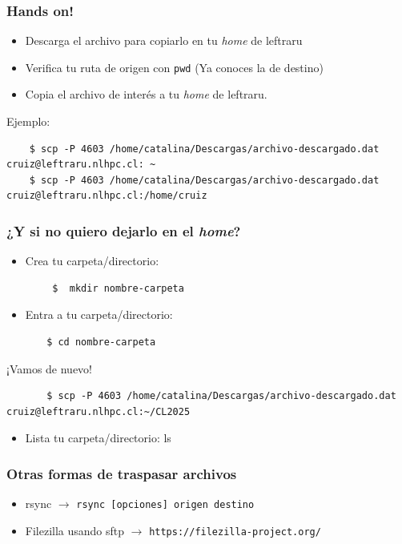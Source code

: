\documentclass[aspectratio=169,professionalfonts]{beamer}
\newenvironment{minted}[2][]{\VerbatimEnvironment\begin{Verbatim}[#1]}{\end{Verbatim}}
\begin{document}
\begin{frame}[fragile]
\frametitle{\textbf{Hands on!}}
\begin{itemize}
    \item  Descarga el archivo para copiarlo en tu \textit{home} de leftraru
    \item Verifica tu ruta de origen con \texttt{pwd} (Ya conoces la de destino) 
    \item     Copia el archivo de interés a tu \textit{home} de leftraru.
\end{itemize}
Ejemplo: \\
\begin{verbatim}
    $ scp -P 4603 /home/catalina/Descargas/archivo-descargado.dat cruiz@leftraru.nlhpc.cl: ~
    $ scp -P 4603 /home/catalina/Descargas/archivo-descargado.dat cruiz@leftraru.nlhpc.cl:/home/cruiz
\end{verbatim}
\end{frame}



\begin{frame}[fragile]
\frametitle{\textbf{¿Y si no quiero dejarlo en el \textit{home}?}}
\begin{itemize}
    \item Crea tu carpeta/directorio:
    \end{itemize}
    \begin{verbatim}
        $  mkdir nombre-carpeta
    \end{verbatim}
   \begin{itemize}
       \item Entra a tu carpeta/directorio:
   \end{itemize}
   \begin{verbatim}
       $ cd nombre-carpeta
   \end{verbatim}
    ¡Vamos de nuevo!
   \begin{verbatim}
       $ scp -P 4603 /home/catalina/Descargas/archivo-descargado.dat cruiz@leftraru.nlhpc.cl:~/CL2025
   \end{verbatim}
   \begin{itemize}
       \item Lista tu carpeta/directorio: ls 
   \end{itemize}
       
\end{frame}

\begin{frame}[fragile]
\frametitle{\textbf{Otras formas de traspasar archivos}}
\begin{itemize}
    \item rsync $\rightarrow$ \texttt{rsync [opciones] origen destino}
    \vspace{0.5em} 
    \item Filezilla usando sftp $\rightarrow$ {\color{blue} \scriptsize \texttt{https://filezilla-project.org/}}
    \end{itemize}
    
\end{frame}
\end{document}
